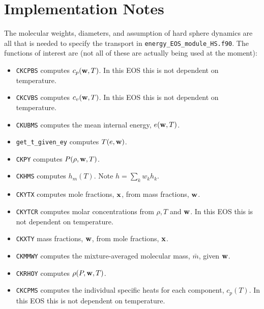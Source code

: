 \documentclass[final]{siamltex}
\def\wb {{\bf w}}
\def\xb {{\bf x}}
\begin{document}
\section{Implementation Notes}
The molecular weights, diameters, and assumption of hard sphere dynamics
 are all that is needed to specify the transport in
{\tt energy\_EOS\_module\_HS.f90}.  The functions of interest are
(not all of these are actually being used at the moment):\\
\begin{itemize}

\item {\tt CKCPBS} computes $c_p(\wb,T)$.  In this EOS this is not dependent on temperature.\\

\item {\tt CKCVBS} computes $c_v(\wb,T)$.  In this EOS this is not dependent on temperature.\\

\item {\tt CKUBMS} computes the mean internal energy, $e(\wb,T)$.\\

\item {\tt get\_t\_given\_ey} computes $T(e,\wb)$.\\

\item {\tt CKPY} computes $P(\rho,\wb,T)$.\\

\item {\tt CKHMS} computes $h_m(T)$.  Note $h = \sum_k w_k h_k$.\\

\item {\tt CKYTX} computes mole fractions, $\xb$, from mass fractions, $\wb$.\\

\item {\tt CKYTCR} computes molar concentrations from $\rho,T$ and $\wb$.
In this EOS this is not dependent on temperature.\\

\item {\tt CKXTY} mass fractions, $\wb$, from mole fractions, $\xb$.\\

\item {\tt CKMMWY} computes the mixture-averaged molecular mass, $\bar{m}$, given $\wb$.\\

\item {\tt CKRHOY} computes $\rho(P,\wb,T)$.\\

\item {\tt CKCPMS} computes the individual specific heats for each component,
$c_p(T)$.  In this EOS this is not dependent on temperature.\\

\end{itemize}
\end{document}

